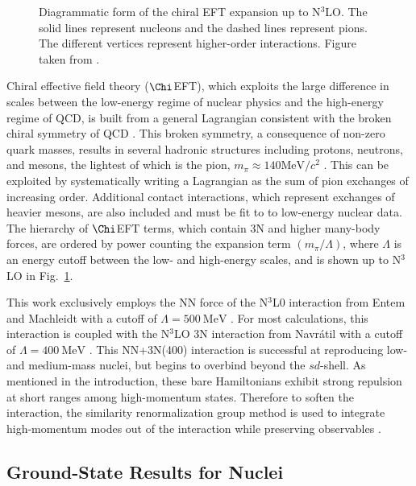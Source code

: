 \documentclass[thesis.tex]{subfiles}
\begin{document}
\begin{figure}[h]
  \centering
  \caption{Diagrammatic form of the chiral EFT expansion up to N$^{3}$LO.  The solid lines represent nucleons and the dashed lines represent pions.  The different vertices represent higher-order interactions.  Figure taken from  \cite{MACHLEIDT2016}.}  
  \label{fig:Chiral_Forces}
\end{figure}

Chiral effective field theory ($\Chi$EFT), which exploits the large difference in scales between the low-energy regime of nuclear physics and the high-energy regime of QCD, is built from a general Lagrangian consistent with the broken chiral symmetry of QCD \cite{EPELBAUM20091773,MACHLEIDT2016}.  This broken symmetry, a consequence of non-zero quark masses, results in several hadronic structures including protons, neutrons, and mesons, the lightest of which is the pion, $m_{\pi}\approx 140\mathrm{MeV}/c^{2}$ \cite{BERINGER2012}.  This can be exploited by systematically writing a Lagrangian as the sum of pion exchanges of increasing order.  Additional contact interactions, which represent exchanges of heavier mesons, are also included and must be fit to to low-energy nuclear data.  The hierarchy of $\Chi$EFT terms, which contain 3N and higher many-body forces, are ordered by power counting the expansion term $(m_{\pi}/\Lambda)$, where $\Lambda$ is an energy cutoff between the low- and high-energy scales, and is shown up to N$^{3}$LO in Fig.\ \ref{fig:Chiral_Forces}.

This work exclusively employs the NN force of the N$^{3}$L0 interaction from Entem and Machleidt with a cutoff of $\Lambda=500\ \mathrm{MeV}$ \cite{ENTEM2003}.  For most calculations, this interaction is coupled with the N$^{3}$LO 3N interaction from Navr\'{a}til with a cutoff of $\Lambda=400\ \mathrm{MeV}$ \cite{NAVRATIL2007}.  This NN+3N(400) interaction is successful at reproducing low- and medium-mass nuclei, but begins to overbind beyond the $sd$-shell.  As mentioned in the introduction, these bare Hamiltonians exhibit strong repulsion at short ranges among high-momentum states.  Therefore to soften the interaction, the similarity renormalization group method is used to integrate high-momentum modes out of the interaction while preserving observables \cite{BOGNER201094,ROTH2011072501}.


\subsection{Ground-State Results for Nuclei} \label{section:nuclear_results}
\end{document}
